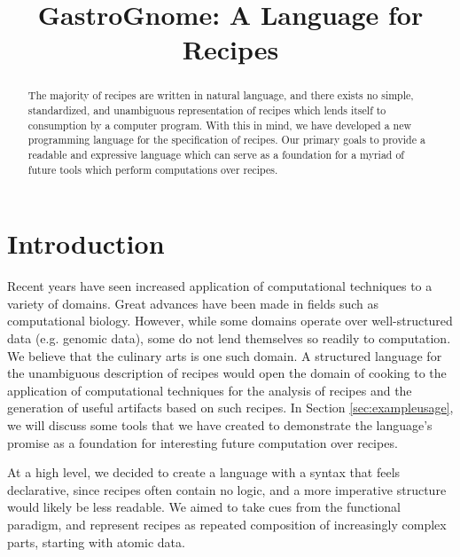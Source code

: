 \documentclass[pldi]{sigplanconf-pldi15}
\begin{document}
%
%

\title{GastroGnome: A Language for Recipes}

\maketitle
\begin{abstract}
The majority of recipes are written in natural language, and there exists no
simple, standardized, and unambiguous representation of recipes which lends
itself to consumption by a computer program. With this in mind, we have
developed a new programming language for the specification of recipes. Our
primary goals to provide a readable and expressive language which can serve as
a foundation for a myriad of future tools which perform computations over
recipes.
\end{abstract}

\section{Introduction}
Recent years have seen increased application of computational techniques to a
variety of domains. Great advances have been made in fields such as
computational biology. However, while some domains operate over
well-structured data (e.g. genomic data), some do not lend themselves so
readily to computation. We believe that the culinary arts is one such domain.
A structured language for the unambiguous description of recipes would open
the domain of cooking to the application of computational techniques for the
analysis of recipes and the generation of useful artifacts based on such
recipes. In Section \ref{sec:exampleusage}, we will discuss some tools that we
have created to demonstrate the language’s promise as a foundation for
interesting future computation over recipes.

At a high level, we decided to create a language with a syntax that feels
declarative, since recipes often contain no logic, and a more imperative
structure would likely be less readable. We aimed to take cues from the
functional paradigm, and represent recipes as repeated composition of
increasingly complex parts, starting with atomic data.
\end{document}
